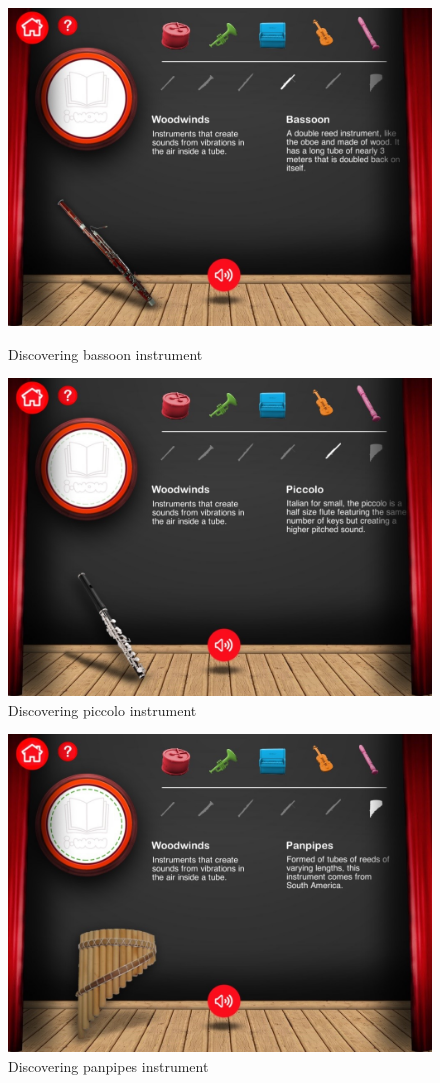 \begin{figure}[ht!]
  \centering
  \includegraphics[width=350pt]{graphics/additional-screens/discovering_wind_bassoon_screen.jpg}
  \vspace{0.05cm}
  \caption{Discovering bassoon instrument}
  \vspace{0.6cm}

  \includegraphics[width=350pt]{graphics/additional-screens/discovering_wind_piccolo_screen.jpg}
  \vspace{0.05cm}
  \caption{Discovering piccolo instrument}
\end{figure}

\begin{figure}[ht!]
  \centering
  \includegraphics[width=350pt]{graphics/additional-screens/discovering_wind_panpipes_screen.jpg}
  \vspace{0.05cm}
  \caption{Discovering panpipes instrument}
\end{figure}

